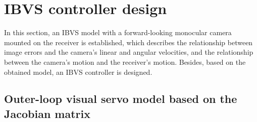 \section{IBVS controller design}
In this section, an IBVS model with a forward-looking monocular camera mounted on the receiver is established, which describes the relationship between image errors and the camera's linear and angular velocities, and the relationship between the camera's motion and the receiver's motion. Besides, based on the obtained model, an IBVS controller is designed.

\subsection{Outer-loop visual servo model based on the Jacobian matrix}


